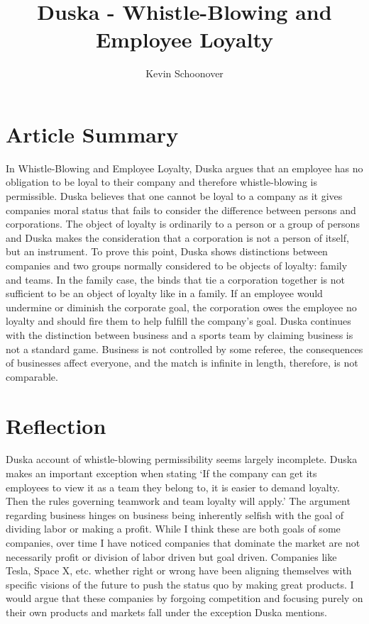 \documentclass[12pt]{article}
\begin{document}
\title{Duska - Whistle-Blowing and Employee Loyalty}
\author{Kevin Schoonover}

\maketitle

\section{Article Summary}
In Whistle-Blowing and Employee Loyalty, Duska argues that an employee has no
obligation to be loyal to their company and therefore whistle-blowing is
permissible. Duska believes that one cannot be loyal to a company as it gives
companies moral status that fails to consider the difference between persons and
corporations. The object of loyalty is ordinarily to a person or a group of
persons and Duska makes the consideration that a corporation is not a person of
itself, but an instrument. To prove this point, Duska shows distinctions between
companies and two groups normally considered to be objects of loyalty: family
and teams. In the family case, the binds that tie a corporation together is not
sufficient to be an object of loyalty like in a family. If an employee would
undermine or diminish the corporate goal, the corporation owes the employee no
loyalty and should fire them to help fulfill the company's goal.  Duska
continues with the distinction between business and a sports team by claiming
business is not a standard game.  Business is not controlled by some referee,
the consequences of businesses affect everyone, and the match is infinite in
length, therefore, is not comparable.

\section{Reflection}
Duska account of whistle-blowing permissibility seems largely incomplete. Duska
makes an important exception when stating `If the company can get its employees
to view it as a team they belong to, it is easier to demand loyalty. Then the
rules governing teamwork and team loyalty will apply.' The argument regarding
business hinges on business being inherently selfish with the goal of dividing
labor or making a profit. While I think these are both goals of some companies,
over time I have noticed companies that dominate the market are not necessarily
profit or division of labor driven but goal driven. Companies like Tesla, Space
X, etc. whether right or wrong have been aligning themselves with specific
visions of the future to push the status quo by making great products. I would
argue that these companies by forgoing competition and focusing purely on their
own products and markets fall under the exception Duska mentions.
\end{document}
